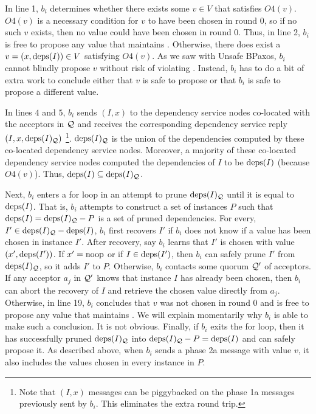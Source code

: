 In line 1, $b_i$ determines whether there exists some $v \in V$ that satisfies
$O4(v)$. $O4(v)$ is a necessary condition for $v$ to have been chosen in round
$0$, so if no such $v$ exists, then no value could have been chosen in round
$0$. Thus, in line 2, $b_i$ is free to propose any value that maintains
.
%
Otherwise, there does exist a $v = (x, \text{deps}(I)) \in V$ satisfying $O4(v)$. As
we saw with Unsafe BPaxos, $b_i$ cannot blindly propose $v$ without risk of
violating . Instead, $b_i$ has to do a bit of extra
work to conclude either that $v$ is safe to propose or that $b_i$ is safe to
propose a different value.

In lines $4$ and $5$, $b_i$ sends $(I, x)$ to the dependency service nodes
co-located with the acceptors in $\mathcal{Q}$ and receives the corresponding
dependency service reply $(I, x, \text{deps}(I)_{\mathcal{Q}})$%
\footnote{%
  Note that $(I, x)$ messages can be piggybacked on the phase 1a messages
  previously sent by $b_i$. This eliminates the extra round trip.
}.
$\text{deps}(I)_{\mathcal{Q}}$ is the union of the dependencies computed by these
co-located dependency service nodes. Moreover, a majority of these co-located
dependency service nodes computed the dependencies of $I$ to be $\text{deps}(I)$
(because $O4(v)$). Thus, $\text{deps}(I) \subseteq \text{deps}(I)_{\mathcal{Q}}$.

Next, $b_i$ enters a for loop in an attempt to prune $\text{deps}(I)_{\mathcal{Q}}$ until
it is equal to $\text{deps}(I)$. That is, $b_i$ attempts to construct a set of
instances $P$ such that $\text{deps}(I) = \text{deps}(I)_{\mathcal{Q}} - P$ is a set of pruned
dependencies. For every, $I' \in \text{deps}(I)_{\mathcal{Q}} - \text{deps}(I)$, $b_i$ first
recovers $I'$ if $b_i$ does not know if a value has been chosen in instance
$I'$. After recovery, say $b_i$ learns that $I'$ is chosen with value $(x',
\text{deps}(I'))$. If $x' = \text{noop}$ or if $I \in \text{deps}(I')$, then $b_i$ can safely
prune $I'$ from $\text{deps}(I)_{\mathcal{Q}}$, so it adds $I'$ to $P$.
%
Otherwise, $b_i$ contacts some quorum $\mathcal{Q}'$ of acceptors. If any acceptor
$a_j$ in $\mathcal{Q}'$ knows that instance $I$ has already been chosen, then $b_i$
can abort the recovery of $I$ and retrieve the chosen value directly from
$a_j$. Otherwise, in line 19, $b_i$ concludes that $v$ was not chosen in round
$0$ and is free to propose any value that maintains
. We will explain momentarily why $b_i$ is able to
make such a conclusion. It is not obvious.
%
Finally, if $b_i$ exits the for loop, then it has successfully pruned
$\text{deps}(I)_{\mathcal{Q}}$ into $\text{deps}(I)_{\mathcal{Q}} - P = \text{deps}(I)$ and can safely
propose it. As described above, when $b_i$ sends a phase 2a message with value
$v$, it also includes the values chosen in every instance in $P$.

